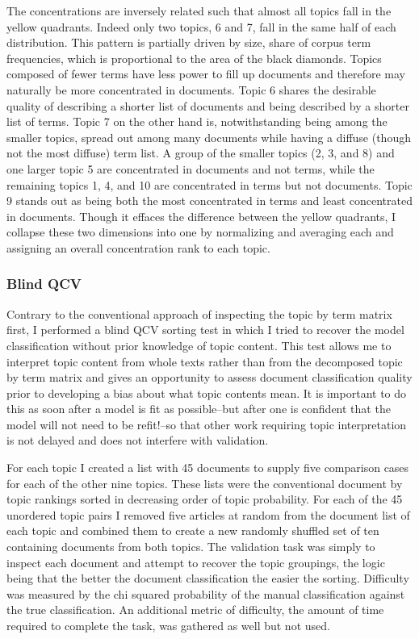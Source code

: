 \documentclass[]{book}
\theoremstyle{definition}
\theoremstyle{definition}
\theoremstyle{definition}
\theoremstyle{remark}
\begin{document}
The concentrations are inversely related such that almost all topics
fall in the yellow quadrants. Indeed only two topics, 6 and 7, fall in
the same half of each distribution. This pattern is partially driven by
size, share of corpus term frequencies, which is proportional to the
area of the black diamonds. Topics composed of fewer terms have less
power to fill up documents and therefore may naturally be more
concentrated in documents. Topic 6 shares the desirable quality of
describing a shorter list of documents and being described by a shorter
list of terms. Topic 7 on the other hand is, notwithstanding being among
the smaller topics, spread out among many documents while having a
diffuse (though not the most diffuse) term list. A group of the smaller
topics (2, 3, and 8) and one larger topic 5 are concentrated in
documents and not terms, while the remaining topics 1, 4, and 10 are
concentrated in terms but not documents. Topic 9 stands out as being
both the most concentrated in terms and least concentrated in documents.
Though it effaces the difference between the yellow quadrants, I
collapse these two dimensions into one by normalizing and averaging each
and assigning an overall concentration rank to each topic.

\hypertarget{blind-qcv}{%
\subsubsection{Blind QCV}\label{blind-qcv}}

Contrary to the conventional approach of inspecting the topic by term
matrix first, I performed a blind QCV sorting test in which I tried to
recover the model classification without prior knowledge of topic
content. This test allows me to interpret topic content from whole texts
rather than from the decomposed topic by term matrix and gives an
opportunity to assess document classification quality prior to
developing a bias about what topic contents mean. It is important to do
this as soon after a model is fit as possible--but after one is
confident that the model will not need to be refit!--so that other work
requiring topic interpretation is not delayed and does not interfere
with validation.

For each topic I created a list with 45 documents to supply five
comparison cases for each of the other nine topics. These lists were the
conventional document by topic rankings sorted in decreasing order of
topic probability. For each of the 45 unordered topic pairs I removed
five articles at random from the document list of each topic and
combined them to create a new randomly shuffled set of ten containing
documents from both topics. The validation task was simply to inspect
each document and attempt to recover the topic groupings, the logic
being that the better the document classification the easier the
sorting. Difficulty was measured by the chi squared probability of the
manual classification against the true classification. An additional
metric of difficulty, the amount of time required to complete the task,
was gathered as well but not used.
\end{document}
